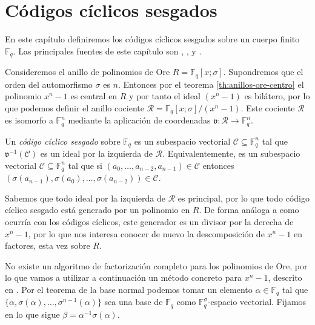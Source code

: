 \chapter{Códigos cíclicos sesgados}

En este capítulo definiremos los códigos cíclicos sesgados sobre un cuerpo finito \(\mathbb F_q\).
Las principales fuentes de este capítulo son \parencite{gomez-torrecillas_new_2016}, \parencite{gomez-torrecillas_petersongorensteinzierler_2018}, \parencite{shi_codes_2017} y \parencite{lam_vandermonde_1988}.

Consideremos el anillo de polinomios de Ore \(R = \mathbb F_q[x; \sigma]\).
Supondremos que el orden del automorfismo \(\sigma\) es \(n\).
Entonces por el teorema \ref{th:anillos-ore-centro} el polinomio \(x^n - 1\) es central en \(R\) y por tanto el ideal \((x^n - 1)\) es bilátero, por lo que podemos definir el anillo cociente \(\mathcal R = \mathbb F_q[x; \sigma]/(x^n - 1)\).
Este cociente \(\mathcal R\) es isomorfo a \(\mathbb F_q^n\) mediante la aplicación de coordenadas \(\mathfrak v : \mathcal R \to \mathbb F_q^n\).

\begin{definition}
  Un \emph{código cíclico sesgado} sobre \(\mathbb F_q\) es un subespacio vectorial \(\mathcal C \subseteq \mathbb F_q^n\) tal que \(\mathfrak v^{-1}(\mathcal C)\) es un ideal por la izquierda de \(\mathcal R\).
  Equivalentemente, es un subespacio vectorial \(\mathcal C \subseteq \mathbb F_q^n\) tal que si \((a_0, \dots, a_{n-2}, a_{n-1}) \in \mathcal C\) entonces \((\sigma(a_{n-1}), \sigma(a_0), \dots, \sigma(a_{n-2})) \in \mathcal C\).
\end{definition}


Sabemos que todo ideal por la izquierda de \(\mathcal R\) es principal, por lo que todo código cíclico sesgado está generado por un polinomio en \(R\).
De forma análoga a como ocurría con los códigos cíclicos, este generador es un divisor por la derecha de \(x^n - 1\), por lo que nos interesa conocer de nuevo la descomposición de \(x^n - 1\) en factores, esta vez sobre \(R\).

No existe un algoritmo de factorización completo para los polinomios de Ore, por lo que vamos a utilizar a continuación un método concreto para \(x^n - 1\), descrito en \parencite{gomez-torrecillas_new_2016}.
Por el teorema de la base normal podemos tomar un elemento \(\alpha \in \mathbb F_q\) tal que \(\{\alpha, \sigma(\alpha), \dots, \sigma^{n-1}(\alpha)\}\) sea una base de  \(\mathbb F_q\) como \(\mathbb F_q^{\sigma}\)-espacio vectorial.
Fijamos en lo que sigue \(\beta = \alpha^{-1}\sigma(\alpha)\).

